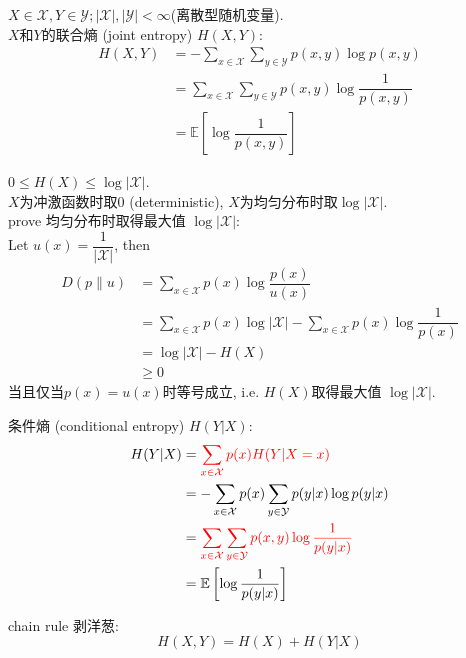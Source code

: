 \begin{definition}
$X\in \mathcal{X}, Y\in\mathcal{Y}; |\mathcal{X}|,|\mathcal{Y}|<\infty$(离散型随机变量). \\
$X$和$Y$的联合熵 (joint entropy) $H(X,Y)$:
\begin{align*}
    H(X,Y)&= -\sum_{x\in\mathcal{X}}\sum_{y\in\mathcal{Y}}p(x,y)\log p(x,y) \\
        &= \sum_{x\in\mathcal{X}}\sum_{y\in\mathcal{Y}}p(x,y)\log\dfrac{1}{p(x,y)} \\
        &= \mathbb{E}\left[\log\dfrac{1}{p(x,y)}\right]
\end{align*}
\end{definition}

\begin{proposition}
$0\leq H(X)\leq \log|\mathcal{X}|$.\\
$X$为冲激函数时取$0$ (deterministic), $X$为均匀分布时取$\log|\mathcal{X}|$.\\
prove 均匀分布时取得最大值 $\log|\mathcal{X}|$:\\
Let $u(x)=\dfrac{1}{|\mathcal{X}|}$, then
\begin{align*}
D\left(p\|u\right) &= \sum_{x\in\mathcal{X}}p(x)\log\dfrac{p(x)}{u(x)} \\
&= \sum_{x\in\mathcal{X}}p(x)\log|\mathcal{X}| - \sum_{x\in\mathcal{X}}p(x)\log\dfrac{1}{p(x)} \\
&= \log|\mathcal{X}| - H(X) \\
&\geq 0
\end{align*}
当且仅当$p(x)=u(x)$时等号成立, i.e. $H(X)$取得最大值 $\log|\mathcal{X}|$.
\end{proposition}


\begin{definition}
条件熵 (conditional entropy) $H(Y|X)$:
\begin{align*}
    H(Y|X)&= \textcolor{red}{\sum_{x\in\mathcal{X}}p(x)H(Y|X=x)} \\
        &= -\sum_{x\in\mathcal{X}}p(x)\sum_{y\in\mathcal{Y}}p(y|x)\log p(y|x) \\
        &= \textcolor{red}{\sum_{x\in\mathcal{X}}\sum_{y\in\mathcal{Y}}p(x,y)\log\dfrac{1}{p(y|x)}} \\
        &= \mathbb{E}\left[\log\dfrac{1}{p(y|x)}\right]
\end{align*}
\end{definition}

\begin{theorem}
    chain rule 剥洋葱:
    $$H(X,Y)=H(X)+H(Y|X)$$
\end{theorem}


